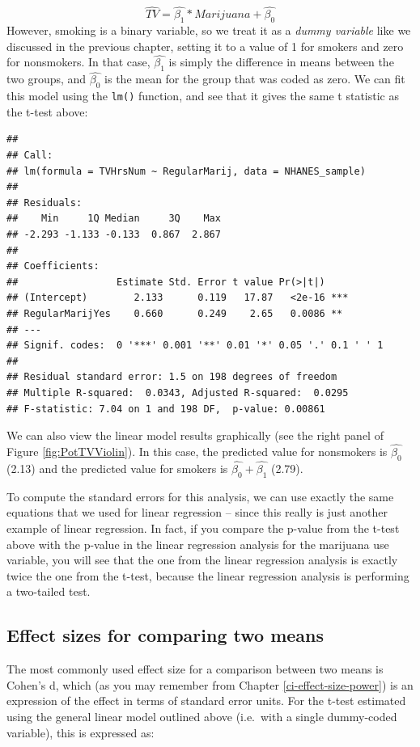 \documentclass[12pt,]{book}
\theoremstyle{definition}
\theoremstyle{definition}
\theoremstyle{definition}
\theoremstyle{remark}
\begin{document}
\[
\hat{TV} = \hat{\beta_1}*Marijuana + \hat{\beta_0}
\]
However, smoking is a binary variable, so we treat it as a \emph{dummy variable} like we discussed in the previous chapter, setting it to a value of 1 for smokers and zero for nonsmokers. In that case, \(\hat{\beta_1}\) is simply the difference in means between the two groups, and \(\hat{\beta_0}\) is the mean for the group that was coded as zero. We can fit this model using the \texttt{lm()} function, and see that it gives the same t statistic as the t-test above:

\begin{verbatim}
## 
## Call:
## lm(formula = TVHrsNum ~ RegularMarij, data = NHANES_sample)
## 
## Residuals:
##    Min     1Q Median     3Q    Max 
## -2.293 -1.133 -0.133  0.867  2.867 
## 
## Coefficients:
##                 Estimate Std. Error t value Pr(>|t|)    
## (Intercept)        2.133      0.119   17.87   <2e-16 ***
## RegularMarijYes    0.660      0.249    2.65   0.0086 ** 
## ---
## Signif. codes:  0 '***' 0.001 '**' 0.01 '*' 0.05 '.' 0.1 ' ' 1
## 
## Residual standard error: 1.5 on 198 degrees of freedom
## Multiple R-squared:  0.0343, Adjusted R-squared:  0.0295 
## F-statistic: 7.04 on 1 and 198 DF,  p-value: 0.00861
\end{verbatim}

We can also view the linear model results graphically (see the right panel of Figure \ref{fig:PotTVViolin}). In this case, the predicted value for nonsmokers is \(\hat{\beta_0}\) (2.13) and the predicted value for smokers is \(\hat{\beta_0} +\hat{\beta_1}\) (2.79).

To compute the standard errors for this analysis, we can use exactly the same equations that we used for linear regression -- since this really is just another example of linear regression. In fact, if you compare the p-value from the t-test above with the p-value in the linear regression analysis for the marijuana use variable, you will see that the one from the linear regression analysis is exactly twice the one from the t-test, because the linear regression analysis is performing a two-tailed test.

\hypertarget{effect-sizes-for-comparing-two-means}{%
\subsection{Effect sizes for comparing two means}\label{effect-sizes-for-comparing-two-means}}

The most commonly used effect size for a comparison between two means is Cohen's d, which (as you may remember from Chapter \ref{ci-effect-size-power}) is an expression of the effect in terms of standard error units. For the t-test estimated using the general linear model outlined above (i.e.~with a single dummy-coded variable), this is expressed as:
\end{document}
